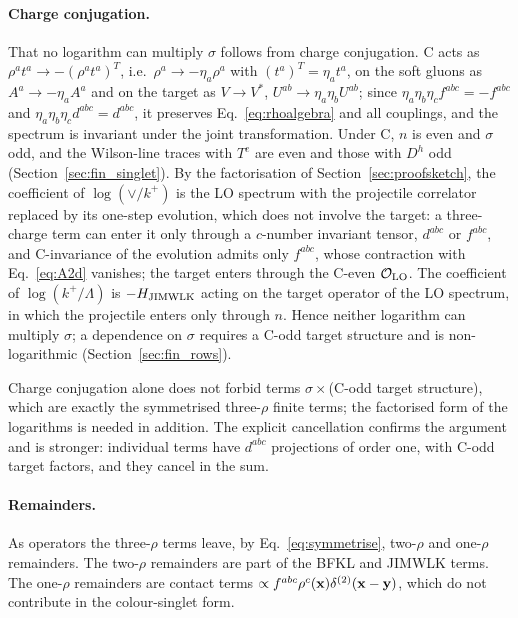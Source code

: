 \paragraph{Charge conjugation.} That no logarithm can multiply $\sigma$ follows from charge conjugation. C acts as $\rho^at^a\to-(\rho^at^a)^T$, i.e.\ $\rho^a\to-\eta_a\rho^a$ with $(t^a)^T=\eta_at^a$, on the soft gluons as $A^a\to-\eta_aA^a$ and on the target as $V\to V^*$, $U^{ab}\to\eta_a\eta_bU^{ab}$; since $\eta_a\eta_b\eta_cf^{abc}=-f^{abc}$ and $\eta_a\eta_b\eta_cd^{abc}=d^{abc}$, it preserves Eq.~\eqref{eq:rhoalgebra} and all couplings, and the spectrum is invariant under the joint transformation. Under C, $n$ is even and $\sigma$ odd, and the Wilson-line traces with $T^e$ are even and those with $D^h$ odd (Section~\ref{sec:fin_singlet}). By the factorisation of Section~\ref{sec:proofsketch}, the coefficient of $\log(\vee/k^+)$ is the LO spectrum with the projectile correlator replaced by its one-step evolution, which does not involve the target: a three-charge term can enter it only through a $c$-number invariant tensor, $d^{abc}$ or $f^{abc}$, and C-invariance of the evolution admits only $f^{abc}$, whose contraction with Eq.~\eqref{eq:A2d} vanishes; the target enters through the C-even $\mathcal O_{\rm LO}$. The coefficient of $\log(k^+/\Lambda)$ is $-H_{\rm JIMWLK}$ acting on the target operator of the LO spectrum, in which the projectile enters only through $n$. Hence neither logarithm can multiply $\sigma$; a dependence on $\sigma$ requires a C-odd target structure and is non-logarithmic (Section~\ref{sec:fin_rows}). 

Charge conjugation alone does not forbid terms $\sigma\times$(C-odd target structure), which are exactly the symmetrised three-$\rho$ finite terms; the factorised form of the logarithms is needed in addition. The explicit cancellation confirms the argument and is stronger: individual terms have $d^{abc}$ projections of order one, with C-odd target factors, and they cancel in the sum.

\paragraph{Remainders.} As operators the three-$\rho$ terms leave, by Eq.~\eqref{eq:symmetrise}, two-$\rho$ and one-$\rho$ remainders. The two-$\rho$ remainders are part of the BFKL and JIMWLK terms. The one-$\rho$ remainders are contact terms $\propto f^{abc}\rho^c(\mathbf{x})\delta^{(2)}(\mathbf{x}-\mathbf{y})$, which do not contribute in the colour-singlet form.

